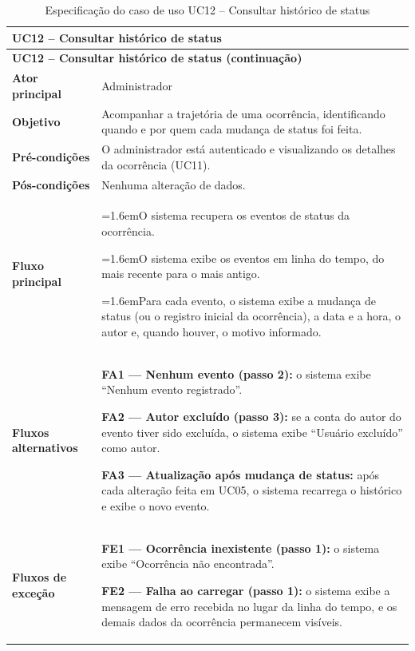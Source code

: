 \documentclass[12pt,a4paper]{article}
\newcommand{\ucitem}[2]{\par\noindent\hangindent=1.6em\hangafter=1\makebox[1.6em][l]{#1}#2}
\begin{document}
\begin{longtable}{|p{}|p{}|}
\caption{Especificação do caso de uso UC12 -- Consultar histórico de status}
\label{tab:uc12} \\
\hline
\multicolumn{2}{|l|}{\textbf{UC12 -- Consultar histórico de status}} \\
\hline
\endfirsthead

\hline
\multicolumn{2}{|l|}{\textbf{UC12 -- Consultar histórico de status (continuação)}} \\
\hline
\endhead

\hline
\endfoot
\textbf{Ator principal} & Administrador \\ \hline
\textbf{Objetivo} & Acompanhar a trajetória de uma ocorrência, identificando quando e por quem cada mudança de status foi feita. \\ \hline
\textbf{Pré-condições} & O administrador está autenticado e visualizando os detalhes da ocorrência (UC11). \\ \hline
\textbf{Pós-condições} & Nenhuma alteração de dados. \\ \hline
\textbf{Fluxo principal} &
\ucitem{1.}{O sistema recupera os eventos de status da ocorrência.}
\ucitem{2.}{O sistema exibe os eventos em linha do tempo, do mais recente para o mais antigo.}
\ucitem{3.}{Para cada evento, o sistema exibe a mudança de status (ou o registro inicial da ocorrência), a data e a hora, o autor e, quando houver, o motivo informado.} \\ \hline
\textbf{Fluxos alternativos} &
\noindent \textbf{FA1 — Nenhum evento (passo 2):} o sistema exibe ``Nenhum evento registrado''.
\par\smallskip\noindent \textbf{FA2 — Autor excluído (passo 3):} se a conta do autor do evento tiver sido excluída, o sistema exibe ``Usuário excluído'' como autor.
\par\smallskip\noindent \textbf{FA3 — Atualização após mudança de status:} após cada alteração feita em UC05, o sistema recarrega o histórico e exibe o novo evento. \\ \hline
\textbf{Fluxos de exceção} &
\noindent \textbf{FE1 — Ocorrência inexistente (passo 1):} o sistema exibe ``Ocorrência não encontrada''.
\par\smallskip\noindent \textbf{FE2 — Falha ao carregar (passo 1):} o sistema exibe a mensagem de erro recebida no lugar da linha do tempo, e os demais dados da ocorrência permanecem visíveis. \\
\end{longtable}
\end{document}
